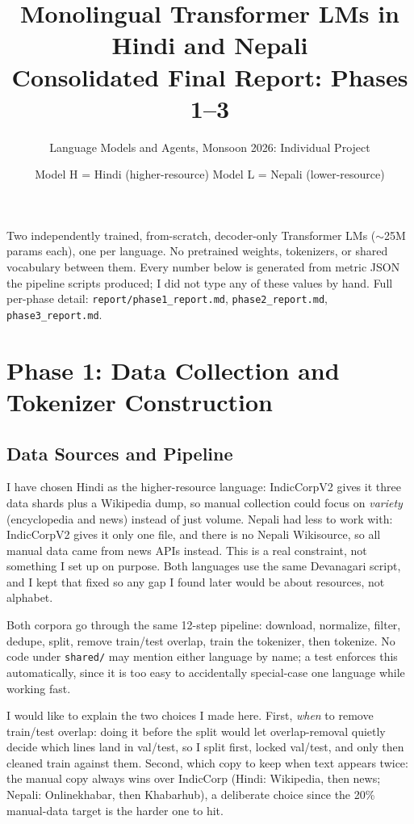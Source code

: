 \documentclass[11pt]{article}
\title{\vspace{-1.5em}\textbf{Monolingual Transformer LMs in Hindi and Nepali}\\
\large Consolidated Final Report: Phases 1--3}
\author{Language Models and Agents, Monsoon 2026: Individual Project}
\date{\small Model H = Hindi (higher-resource) \quad Model L = Nepali (lower-resource)}
\begin{document}
\maketitle
\vspace{-2.2em}

\begin{center}\small
Two independently trained, from-scratch, decoder-only Transformer LMs ($\sim$25M params each), one per language.
No pretrained weights, tokenizers, or shared vocabulary between them.
Every number below is generated from metric JSON the pipeline scripts produced; I did not type any of these values by hand.
Full per-phase detail: \texttt{report/phase1\_report.md}, \texttt{phase2\_report.md}, \texttt{phase3\_report.md}.
\end{center}
\vspace{-0.3em}

\section{Phase 1: Data Collection and Tokenizer Construction}

\subsection{Data Sources and Pipeline}

I have chosen Hindi as the higher-resource language: IndicCorpV2 gives it three data shards plus a Wikipedia dump, so manual collection could focus on \emph{variety} (encyclopedia and news) instead of just volume. Nepali had less to work with: IndicCorpV2 gives it only one file, and there is no Nepali Wikisource, so all manual data came from news APIs instead. This is a real constraint, not something I set up on purpose. Both languages use the same Devanagari script, and I kept that fixed so any gap I found later would be about resources, not alphabet.

Both corpora go through the same 12-step pipeline: download, normalize, filter, dedupe, split, remove train/test overlap, train the tokenizer, then tokenize. No code under \texttt{shared/} may mention either language by name; a test enforces this automatically, since it is too easy to accidentally special-case one language while working fast.

I would like to explain the two choices I made here. First, \emph{when} to remove train/test overlap: doing it before the split would let overlap-removal quietly decide which lines land in val/test, so I split first, locked val/test, and only then cleaned train against them. Second, which copy to keep when text appears twice: the manual copy always wins over IndicCorp (Hindi: Wikipedia, then news; Nepali: Onlinekhabar, then Khabarhub), a deliberate choice since the 20\% manual-data target is the harder one to hit.
\end{document}
